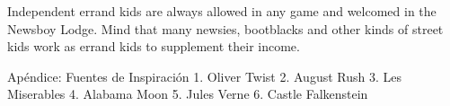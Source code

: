 Independent errand kids are always allowed in any game and welcomed in the Newsboy Lodge. Mind that many newsies, bootblacks and other kinds of street kids work as errand kids to supplement their income.


Apéndice: Fuentes de Inspiración
1. Oliver Twist
2. August Rush
3. Les Miserables
4. Alabama Moon
5. Jules Verne
6. Castle Falkenstein
